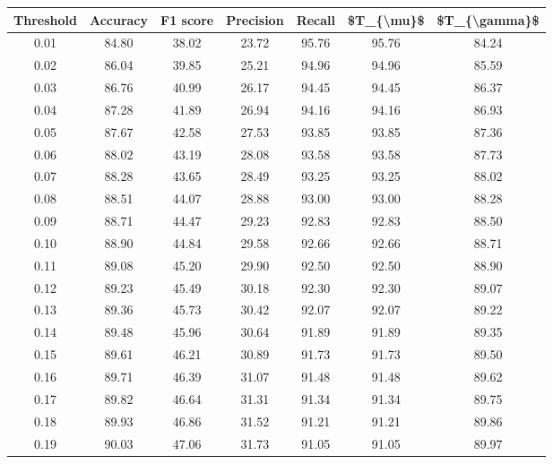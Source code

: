 \begin{tabular}{|c|c|c|c|c|c|c|}
\hline
 Threshold &  Accuracy &  F1 score &  Precision &  Recall &  \$T\_\{\textbackslash mu\}\$ &  \$T\_\{\textbackslash gamma\}\$ \\
\hline
      0.01 &     84.80 &     38.02 &      23.72 &   95.76 &      95.76 &         84.24 \\
      0.02 &     86.04 &     39.85 &      25.21 &   94.96 &      94.96 &         85.59 \\
      0.03 &     86.76 &     40.99 &      26.17 &   94.45 &      94.45 &         86.37 \\
      0.04 &     87.28 &     41.89 &      26.94 &   94.16 &      94.16 &         86.93 \\
      0.05 &     87.67 &     42.58 &      27.53 &   93.85 &      93.85 &         87.36 \\
      0.06 &     88.02 &     43.19 &      28.08 &   93.58 &      93.58 &         87.73 \\
      0.07 &     88.28 &     43.65 &      28.49 &   93.25 &      93.25 &         88.02 \\
      0.08 &     88.51 &     44.07 &      28.88 &   93.00 &      93.00 &         88.28 \\
      0.09 &     88.71 &     44.47 &      29.23 &   92.83 &      92.83 &         88.50 \\
      0.10 &     88.90 &     44.84 &      29.58 &   92.66 &      92.66 &         88.71 \\
      0.11 &     89.08 &     45.20 &      29.90 &   92.50 &      92.50 &         88.90 \\
      0.12 &     89.23 &     45.49 &      30.18 &   92.30 &      92.30 &         89.07 \\
      0.13 &     89.36 &     45.73 &      30.42 &   92.07 &      92.07 &         89.22 \\
      0.14 &     89.48 &     45.96 &      30.64 &   91.89 &      91.89 &         89.35 \\
      0.15 &     89.61 &     46.21 &      30.89 &   91.73 &      91.73 &         89.50 \\
      0.16 &     89.71 &     46.39 &      31.07 &   91.48 &      91.48 &         89.62 \\
      0.17 &     89.82 &     46.64 &      31.31 &   91.34 &      91.34 &         89.75 \\
      0.18 &     89.93 &     46.86 &      31.52 &   91.21 &      91.21 &         89.86 \\
      0.19 &     90.03 &     47.06 &      31.73 &   91.05 &      91.05 &         89.97 \\

\end{tabular}
